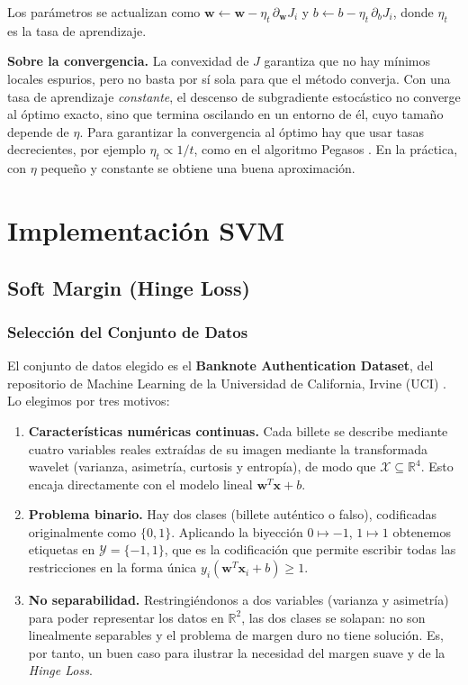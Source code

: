 \documentclass[12pt, a4paper]{article}
\begin{document}
\noindent Los parámetros se actualizan como $\mathbf{w} \leftarrow \mathbf{w} - \eta_t\, \partial_{\mathbf{w}} J_i$ y $b \leftarrow b - \eta_t\, \partial_b J_i$, donde $\eta_t$ es la tasa de aprendizaje.

\noindent \textbf{Sobre la convergencia.} La convexidad de $J$ garantiza que no hay mínimos locales espurios, pero no basta por sí sola para que el método converja. Con una tasa de aprendizaje \textit{constante}, el descenso de subgradiente estocástico no converge al óptimo exacto, sino que termina oscilando en un entorno de él, cuyo tamaño depende de $\eta$. Para garantizar la convergencia al óptimo hay que usar tasas decrecientes, por ejemplo $\eta_t \propto 1/t$, como en el algoritmo Pegasos \cite{shalevshwartz2011pegasos}. En la práctica, con $\eta$ pequeño y constante se obtiene una buena aproximación.

\newpage
\section{Implementación SVM}

\subsection{Soft Margin (Hinge Loss)}
\subsubsection{Selección del Conjunto de Datos}

\noindent El conjunto de datos elegido es el \textbf{Banknote Authentication Dataset}, del repositorio de Machine Learning de la Universidad de California, Irvine (UCI) \cite{Dua:2019}. Lo elegimos por tres motivos:
\begin{enumerate}
    \item \textbf{Características numéricas continuas.} Cada billete se describe mediante cuatro variables reales extraídas de su imagen mediante la transformada wavelet (varianza, asimetría, curtosis y entropía), de modo que $\mathcal{X} \subseteq \mathbb{R}^4$. Esto encaja directamente con el modelo lineal $\mathbf{w}^T\mathbf{x} + b$.

    \item \textbf{Problema binario.} Hay dos clases (billete auténtico o falso), codificadas originalmente como $\{0, 1\}$. Aplicando la biyección $0 \mapsto -1$, $1 \mapsto 1$ obtenemos etiquetas en $\mathcal{Y} = \{-1, 1\}$, que es la codificación que permite escribir todas las restricciones en la forma única $y_i(\mathbf{w}^T \mathbf{x}_i + b) \geq 1$.

    \item \textbf{No separabilidad.} Restringiéndonos a dos variables (varianza y asimetría) para poder representar los datos en $\mathbb{R}^2$, las dos clases se solapan: no son linealmente separables y el problema de margen duro no tiene solución. Es, por tanto, un buen caso para ilustrar la necesidad del margen suave y de la \textit{Hinge Loss}.
\end{enumerate}
\end{document}
